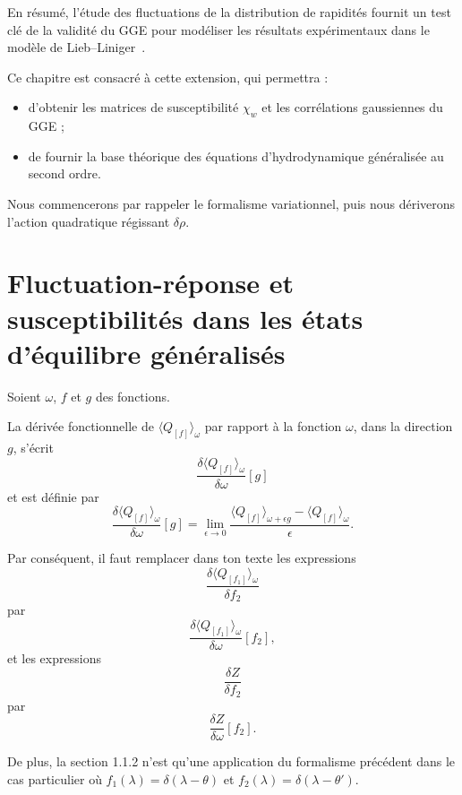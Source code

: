 \medskip
En résumé, l’étude des fluctuations de la distribution de rapidités fournit un test clé de la validité du GGE pour modéliser les résultats expérimentaux dans le modèle de Lieb–Liniger~\cite{DeNardis2017}.

\medskip
Ce chapitre est consacré à cette extension, qui permettra :
\begin{itemize}[label = $\bullet$]
  \item d’obtenir les matrices de susceptibilité \(\chi_{w}\)  et les corrélations gaussiennes du GGE ;
  \item de fournir la base théorique des équations d’hydrodynamique généralisée au second ordre.
\end{itemize}

Nous commencerons par rappeler le formalisme variationnel, puis nous dériverons l’action quadratique régissant \(\delta\rho\).  %


\section{Fluctuation-réponse et susceptibilités dans les états d’équilibre généralisés}

Soient $\omega$, $f$ et $g$ des fonctions.

La dérivée fonctionnelle de $\langle Q_{[f]} \rangle_{\omega}$ par rapport à la fonction $\omega$, dans la direction $g$, s'écrit
\[
\frac{\delta \langle Q_{[f]} \rangle_{\omega} }{\delta \omega}[g]
\]
et est définie par
\[
\frac{\delta \langle Q_{[f]} \rangle_{\omega} }{\delta \omega}[g] = \lim_{\epsilon \rightarrow 0} \frac{\langle Q_{[f]} \rangle_{\omega + \epsilon g} - \langle Q_{[f]} \rangle_{\omega}}{\epsilon}.
\]

Par conséquent, il faut remplacer dans ton texte les expressions
\[
\frac{\delta \langle Q_{[f_1]} \rangle_{\omega} }{\delta f_2}
\]
par
\[
\frac{\delta \langle Q_{[f_1]} \rangle_{\omega} }{\delta \omega}[f_2],
\]
et les expressions
\[
\frac{\delta Z}{\delta f_2}
\]
par
\[
\frac{\delta Z}{\delta \omega}[f_2].
\]

De plus, la section 1.1.2 n’est qu’une application du formalisme précédent dans le cas particulier où $f_1(\lambda) = \delta(\lambda - \theta)$ et $f_2(\lambda) = \delta(\lambda - \theta')$.

